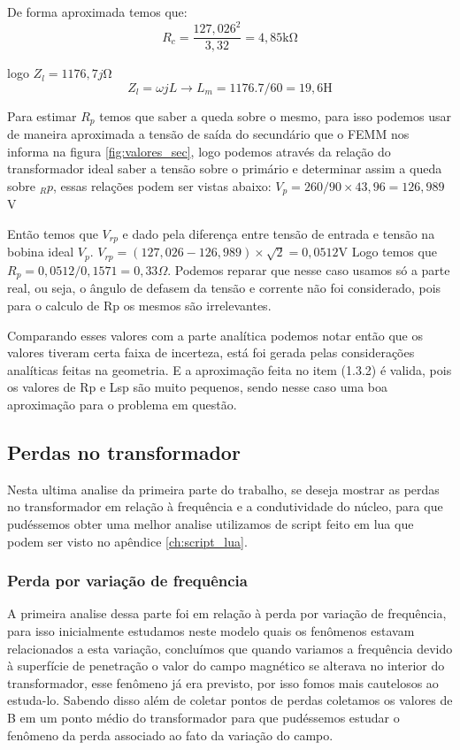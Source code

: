 \documentclass[
	12pt,				%
	openright,			%
	twoside,			%
	a4paper,			%
	english,			%
	french,				%
	spanish,			%
	brazil,				%
	]{abntex2}
\begin{document}
De forma aproximada temos que:
$$R_{c} = \frac{127,026^2}{3,32} = 4,85 \mathrm{k\Omega}$$

logo $Z_{l} = 1176,7j \mathrm{\Omega}$
$$Z_{l} = \omega jL \rightarrow L_{m} = 1176.7/60  = 19,6\mathrm{H}$$

Para estimar $R_{p}$ temos que saber a queda sobre o mesmo, para isso podemos usar de maneira aproximada a tensão de saída do secundário que o FEMM nos informa na figura \ref{fig:valores_sec}, logo podemos através da relação do transformador ideal  saber a tensão sobre o primário e determinar assim a queda sobre $_R{p}$, essas relações podem ser vistas abaixo: 
$V_{p} = 260/90 \times 43,96 = 126,989$V

Então temos que $V_{rp}$ e dado pela diferença entre tensão de entrada e tensão na bobina ideal $V_{p}$.  $V_{rp} = (127,026 - 126,989) \times \sqrt{2} = 0,0512$V
Logo temos que $R_{p} = 0,0512/0,1571 = 0,33 \Omega$. Podemos reparar que nesse caso usamos só a parte real, ou seja, o ângulo de defasem da tensão e corrente não foi considerado, pois para o calculo de Rp os mesmos são irrelevantes.

Comparando esses valores com a parte analítica podemos notar então que os valores tiveram certa faixa de incerteza, está foi gerada pelas considerações analíticas feitas na geometria.  E a aproximação feita no item (1.3.2) é valida, pois os valores de Rp e Lsp são muito pequenos, sendo nesse caso uma boa aproximação para o problema em questão.

\subsection{Perdas no transformador}
Nesta ultima analise da primeira parte do trabalho, se deseja mostrar as perdas no transformador em relação à frequência e a condutividade do núcleo, para que pudéssemos obter uma melhor analise utilizamos de script feito em lua que podem ser visto no  apêndice \ref{ch:script_lua}. 

\subsubsection{Perda por variação de frequência}
A primeira analise dessa parte foi em relação à perda por variação de frequência, para isso inicialmente estudamos neste modelo quais os fenômenos estavam relacionados a esta variação, concluímos que quando variamos a frequência devido à superfície de penetração o valor do campo magnético se alterava no interior do transformador, esse fenômeno já era previsto, por isso fomos mais cautelosos ao estuda-lo. Sabendo disso além de coletar pontos de perdas coletamos os valores de B em um ponto médio do transformador para que pudéssemos estudar o fenômeno da perda associado ao fato da variação do campo.
\end{document}

